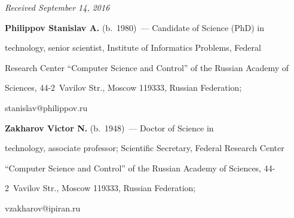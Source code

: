 







\vspace*{-3pt}





\hfill{\small\textit{Received September 14, 2016}}





  \Contr


  


  \noindent


  \textbf{Philippov Stanislav A.} (b.\ 1980)~--- Candidate of Science (PhD) in 


technology, senior scientist, Institute of Informatics Problems, Federal 


Research Center ``Computer Science and Control'' of the Russian Academy of 


Sciences, 44-2~Vavilov Str., Moscow 119333, Russian Federation; 


\mbox{stanislav@philippov.ru}


  


  \vspace*{3pt}


  


  \noindent


  \textbf{Zakharov Victor N.} (b.\ 1948)~--- Doctor of Science in 


technology, associate professor; Scientific Secretary, Federal Research Center 


``Computer Science and Control'' of the Russian Academy of Sciences, 44-


2~Vavilov Str., Moscow 119333, Russian Federation; 


\mbox{vzakharov@ipiran.ru} 


  


\label{end\stat}








\renewcommand{\bibname}{\protect\rm Литература}


